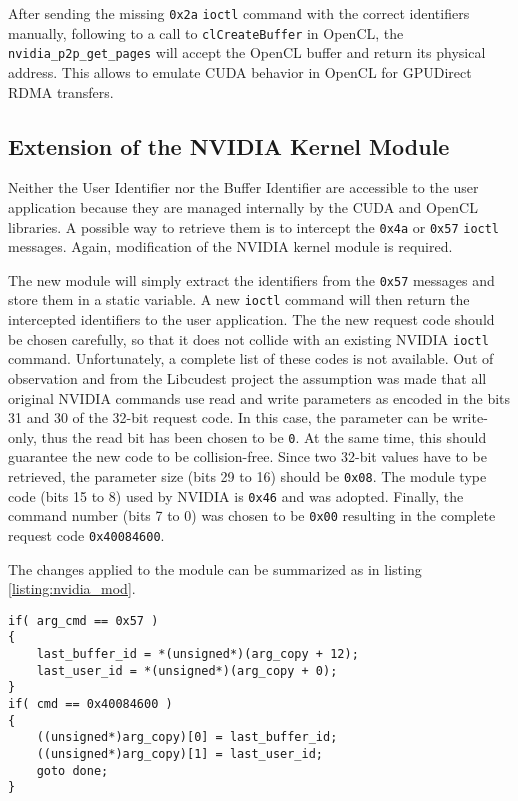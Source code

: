 After sending the missing \texttt{0x2a} \texttt{ioctl} command with the correct identifiers manually, following to a call to \texttt{clCreateBuffer} in OpenCL, the \texttt{nvidia\_p2p\_get\_pages} will accept the OpenCL buffer and return its physical address.
This allows to emulate CUDA behavior in OpenCL for GPUDirect RDMA transfers.




\subsection{Extension of the NVIDIA Kernel Module}

\label{section:nvidiamod}

Neither the User Identifier nor the Buffer Identifier are accessible to the user application because they are managed internally by the CUDA and OpenCL libraries.
A possible way to retrieve them is to intercept the \texttt{0x4a} or \texttt{0x57} \texttt{ioctl} messages.
Again, modification of the NVIDIA kernel module is required.

The new module will simply extract the identifiers from the \texttt{0x57} messages and store them in a static variable.
A new \texttt{ioctl} command will then return the intercepted identifiers to the user application.
The the new request code should be chosen carefully, so that it does not collide with an existing NVIDIA \texttt{ioctl} command.
Unfortunately, a complete list of these codes is not available.
Out of observation and from the Libcudest project \cite{libcudest} the assumption was made that all original NVIDIA commands use read and write parameters as encoded in the bits 31 and 30 of the 32-bit request code.
In this case, the parameter can be write-only, thus the read bit has been chosen to be \texttt{0}.
At the same time, this should guarantee the new code to be collision-free.
Since two 32-bit values have to be retrieved, the parameter size (bits 29 to 16) should be \texttt{0x08}.
The module type code (bits 15 to 8) used by NVIDIA is \texttt{0x46} and was adopted.
Finally, the command number (bits 7 to 0) was chosen to be \texttt{0x00} resulting in the complete request code \texttt{0x40084600}.



The changes applied to the module can be summarized as in listing \ref{listing:nvidia_mod}.

\begin{lstlisting}[label=listing:nvidia_mod, caption=Changes to \texttt{nvidia\_ioctl(..)} in the  NVIDIA kernel module]
if( arg_cmd == 0x57 )
{
	last_buffer_id = *(unsigned*)(arg_copy + 12);
	last_user_id = *(unsigned*)(arg_copy + 0);
}
if( cmd == 0x40084600 )
{
	((unsigned*)arg_copy)[0] = last_buffer_id;
	((unsigned*)arg_copy)[1] = last_user_id;
	goto done;
}
\end{lstlisting}

